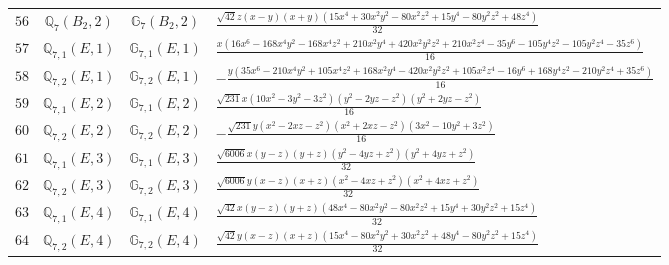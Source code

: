 \documentclass[fleqn,8pt,landscape]{jsarticle}
\begin{document}
\begin{table}[ht!]
\begin{center}
\begin{tabular}{cccl}
$ 56 $ & $ \mathbb{Q}_{7}(B_{2},2) $ & $ \mathbb{G}_{7}(B_{2},2) $ & $ \frac{\sqrt{42} z \left(x - y\right) \left(x + y\right) \left(15 x^{4} + 30 x^{2} y^{2} - 80 x^{2} z^{2} + 15 y^{4} - 80 y^{2} z^{2} + 48 z^{4}\right)}{32} $ \\
$ 57 $ & $ \mathbb{Q}_{7,1}(E,1) $ & $ \mathbb{G}_{7,1}(E,1) $ & $ \frac{x \left(16 x^{6} - 168 x^{4} y^{2} - 168 x^{4} z^{2} + 210 x^{2} y^{4} + 420 x^{2} y^{2} z^{2} + 210 x^{2} z^{4} - 35 y^{6} - 105 y^{4} z^{2} - 105 y^{2} z^{4} - 35 z^{6}\right)}{16} $ \\
$ 58 $ & $ \mathbb{Q}_{7,2}(E,1) $ & $ \mathbb{G}_{7,2}(E,1) $ & $ - \frac{y \left(35 x^{6} - 210 x^{4} y^{2} + 105 x^{4} z^{2} + 168 x^{2} y^{4} - 420 x^{2} y^{2} z^{2} + 105 x^{2} z^{4} - 16 y^{6} + 168 y^{4} z^{2} - 210 y^{2} z^{4} + 35 z^{6}\right)}{16} $ \\
$ 59 $ & $ \mathbb{Q}_{7,1}(E,2) $ & $ \mathbb{G}_{7,1}(E,2) $ & $ \frac{\sqrt{231} x \left(10 x^{2} - 3 y^{2} - 3 z^{2}\right) \left(y^{2} - 2 y z - z^{2}\right) \left(y^{2} + 2 y z - z^{2}\right)}{16} $ \\
$ 60 $ & $ \mathbb{Q}_{7,2}(E,2) $ & $ \mathbb{G}_{7,2}(E,2) $ & $ - \frac{\sqrt{231} y \left(x^{2} - 2 x z - z^{2}\right) \left(x^{2} + 2 x z - z^{2}\right) \left(3 x^{2} - 10 y^{2} + 3 z^{2}\right)}{16} $ \\
$ 61 $ & $ \mathbb{Q}_{7,1}(E,3) $ & $ \mathbb{G}_{7,1}(E,3) $ & $ \frac{\sqrt{6006} x \left(y - z\right) \left(y + z\right) \left(y^{2} - 4 y z + z^{2}\right) \left(y^{2} + 4 y z + z^{2}\right)}{32} $ \\
$ 62 $ & $ \mathbb{Q}_{7,2}(E,3) $ & $ \mathbb{G}_{7,2}(E,3) $ & $ \frac{\sqrt{6006} y \left(x - z\right) \left(x + z\right) \left(x^{2} - 4 x z + z^{2}\right) \left(x^{2} + 4 x z + z^{2}\right)}{32} $ \\
$ 63 $ & $ \mathbb{Q}_{7,1}(E,4) $ & $ \mathbb{G}_{7,1}(E,4) $ & $ \frac{\sqrt{42} x \left(y - z\right) \left(y + z\right) \left(48 x^{4} - 80 x^{2} y^{2} - 80 x^{2} z^{2} + 15 y^{4} + 30 y^{2} z^{2} + 15 z^{4}\right)}{32} $ \\
$ 64 $ & $ \mathbb{Q}_{7,2}(E,4) $ & $ \mathbb{G}_{7,2}(E,4) $ & $ \frac{\sqrt{42} y \left(x - z\right) \left(x + z\right) \left(15 x^{4} - 80 x^{2} y^{2} + 30 x^{2} z^{2} + 48 y^{4} - 80 y^{2} z^{2} + 15 z^{4}\right)}{32} $ \\
 \hline \hline
\end{tabular}
\end{center}
\end{table}
\end{document}

